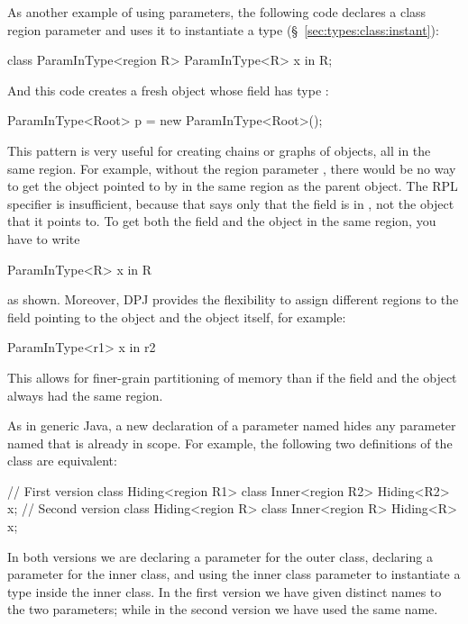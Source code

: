 As another example of using parameters, the following code declares a
class region parameter  and uses it to instantiate a type
(\S~\ref{sec:types:class:instant}):
%
\begin{dpjlisting}
class ParamInType<region R> {
    ParamInType<R> x in R;
}
\end{dpjlisting}
%
And this code creates a fresh  object whose field
 has type :
%
\begin{dpjlisting}
ParamInType<Root> p = new ParamInType<Root>();
\end{dpjlisting}
%
This pattern is very useful for creating chains or graphs of objects,
all in the same region.  For example, without the region parameter
, there would be no way to get the object pointed to by 
in the same region as the parent object.  The RPL specifier  is insufficient, because that says only that the field  is
in , not the object that it points to.  To get both the field
and the object in the same region, you have to write
%
\begin{dpjlisting}
ParamInType<R> x in R
\end{dpjlisting}
%
as shown.  Moreover, DPJ provides the flexibility to assign different
regions to the field pointing to the object and the object itself, for
example:
%
\begin{dpjlisting}
ParamInType<r1> x in r2
\end{dpjlisting}
%
This allows for finer-grain partitioning of memory than if the field
and the object always had the same region.

%
As in generic Java, a new declaration of a parameter named 
hides any parameter named  that is already in scope.  For
example, the following two definitions of the class  are
equivalent:
%
\begin{dpjlisting}
// First version
class Hiding<region R1> {
    class Inner<region R2> {
        Hiding<R2> x;
    }
}
// Second version
class Hiding<region R> {
    class Inner<region R> {
        Hiding<R> x;
    }
}
\end{dpjlisting}
%
In both versions we are declaring a parameter for the outer class,
declaring a parameter for the inner class, and using the inner class
parameter to instantiate a type inside the inner class.  In the first
version we have given distinct names to the two parameters; while in
the second version we have used the same name.

